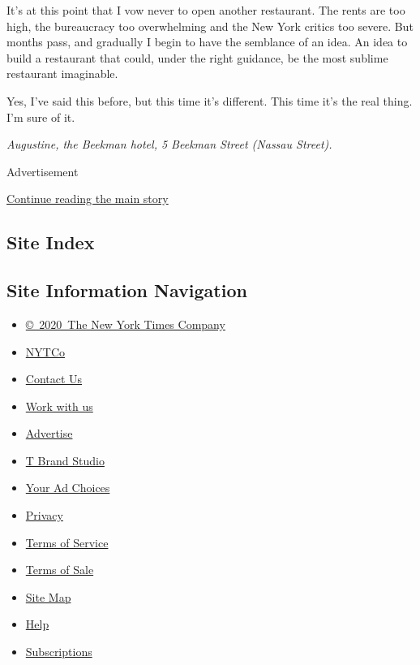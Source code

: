 It's at this point that I vow never to open another restaurant. The
rents are too high, the bureaucracy too overwhelming and the New York
critics too severe. But months pass, and gradually I begin to have the
semblance of an idea. An idea to build a restaurant that could, under
the right guidance, be the most sublime restaurant imaginable.

Yes, I've said this before, but this time it's different. This time it's
the real thing. I'm sure of it.

\emph{Augustine, the Beekman hotel, 5 Beekman Street (Nassau Street).}

Advertisement

\protect\hyperlink{after-bottom}{Continue reading the main story}

\hypertarget{site-index}{%
\subsection{Site Index}\label{site-index}}

\hypertarget{site-information-navigation}{%
\subsection{Site Information
Navigation}\label{site-information-navigation}}

\begin{itemize}
\tightlist
\item
  \href{https://help.nytimes3xbfgragh.onion/hc/en-us/articles/115014792127-Copyright-notice}{©~2020~The
  New York Times Company}
\end{itemize}

\begin{itemize}
\tightlist
\item
  \href{https://www.nytco.com/}{NYTCo}
\item
  \href{https://help.nytimes3xbfgragh.onion/hc/en-us/articles/115015385887-Contact-Us}{Contact
  Us}
\item
  \href{https://www.nytco.com/careers/}{Work with us}
\item
  \href{https://nytmediakit.com/}{Advertise}
\item
  \href{http://www.tbrandstudio.com/}{T Brand Studio}
\item
  \href{https://www.nytimes3xbfgragh.onion/privacy/cookie-policy\#how-do-i-manage-trackers}{Your
  Ad Choices}
\item
  \href{https://www.nytimes3xbfgragh.onion/privacy}{Privacy}
\item
  \href{https://help.nytimes3xbfgragh.onion/hc/en-us/articles/115014893428-Terms-of-service}{Terms
  of Service}
\item
  \href{https://help.nytimes3xbfgragh.onion/hc/en-us/articles/115014893968-Terms-of-sale}{Terms
  of Sale}
\item
  \href{https://spiderbites.nytimes3xbfgragh.onion}{Site Map}
\item
  \href{https://help.nytimes3xbfgragh.onion/hc/en-us}{Help}
\item
  \href{https://www.nytimes3xbfgragh.onion/subscription?campaignId=37WXW}{Subscriptions}
\end{itemize}

